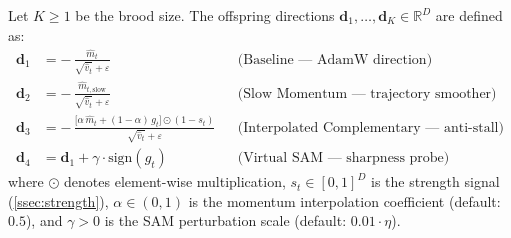 \documentclass[12pt]{article}
\newcommand{\eqbox}[2]{%
  \begin{tcolorbox}[eqstyle, title={#1}]
    #2
  \end{tcolorbox}
}
\newcommand{\R}{\mathbb{R}}
\newcommand{\sign}{\mathrm{sign}}
\begin{document}
\eqbox{Definition 1 --- Offspring Directions}{
Let $K \geq 1$ be the brood size.
The offspring directions
$\mathbf{d}_1, \ldots, \mathbf{d}_K \in \R^D$ are defined as:
\begin{align}
  \mathbf{d}_1 &= -\,\frac{\hat{m}_t}{\sqrt{\hat{v}_t} + \varepsilon}
  &&\text{(Baseline --- AdamW direction)}
  \label{eq:offspring_baseline} \\[8pt]
  \mathbf{d}_2 &= -\,\frac{\hat{m}_{t,\mathrm{slow}}}
    {\sqrt{\hat{v}_t} + \varepsilon}
  &&\text{(Slow Momentum --- trajectory smoother)}
  \label{eq:offspring_slow} \\[8pt]
  \mathbf{d}_3 &= -\,\frac{
    \bigl[\alpha\,\hat{m}_t + (1 - \alpha)\,g_t\bigr]
    \odot (1 - s_t)
  }{\sqrt{\hat{v}_t} + \varepsilon}
  &&\text{(Interpolated Complementary --- anti-stall)}
  \label{eq:offspring_complementary} \\[8pt]
  \mathbf{d}_4 &= \mathbf{d}_1
    + \gamma \cdot \sign(g_t)
  &&\text{(Virtual SAM --- sharpness probe)}
  \label{eq:offspring_sam}
\end{align}
where $\odot$ denotes element-wise multiplication,
$s_t \in [0, 1]^D$ is the strength signal (\cref{ssec:strength}),
$\alpha \in (0, 1)$ is the momentum interpolation coefficient
(default: $0.5$), and $\gamma > 0$ is the SAM perturbation scale
(default: $0.01 \cdot \eta$).
}
\end{document}
